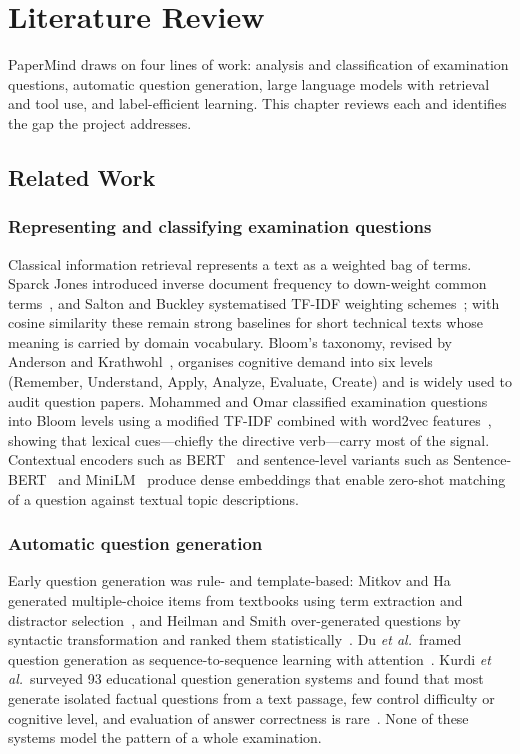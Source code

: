 \chapter{Literature Review}\label{ch:lit}
PaperMind draws on four lines of work: analysis and classification of examination questions, automatic question
generation, large language models with retrieval and tool use, and label-efficient learning. This chapter reviews each
and identifies the gap the project addresses.

\section{Related Work}
\subsection{Representing and classifying examination questions}
Classical information retrieval represents a text as a weighted bag of terms. Sparck Jones introduced inverse document
frequency to down-weight common terms~\cite{sparckjones1972}, and Salton and Buckley systematised TF-IDF weighting
schemes~\cite{salton1988}; with cosine similarity these remain strong baselines for short technical texts whose meaning
is carried by domain vocabulary. Bloom's taxonomy, revised by Anderson and Krathwohl~\cite{anderson2001}, organises
cognitive demand into six levels (Remember, Understand, Apply, Analyze, Evaluate, Create) and is widely used to audit
question papers. Mohammed and Omar classified examination questions into Bloom levels using a modified TF-IDF combined
with word2vec features~\cite{mohammed2020}, showing that lexical cues---chiefly the directive verb---carry most of the
signal. Contextual encoders such as BERT~\cite{devlin2019} and sentence-level variants such as
Sentence-BERT~\cite{reimers2019} and MiniLM~\cite{wang2020minilm} produce dense embeddings that enable zero-shot matching
of a question against textual topic descriptions.

\subsection{Automatic question generation}
Early question generation was rule- and template-based: Mitkov and Ha generated multiple-choice items from
textbooks using term extraction and distractor selection~\cite{mitkov2003}, and Heilman and Smith over-generated
questions by syntactic transformation and ranked them statistically~\cite{heilman2010}. Du \emph{et al.}\ framed
question generation as sequence-to-sequence learning with attention~\cite{du2017}. Kurdi \emph{et al.}\ surveyed
93 educational question generation systems and found that most generate isolated factual questions from a text passage,
few control difficulty or cognitive level, and evaluation of answer correctness is rare~\cite{kurdi2020}. None of these
systems model the pattern of a whole examination.

